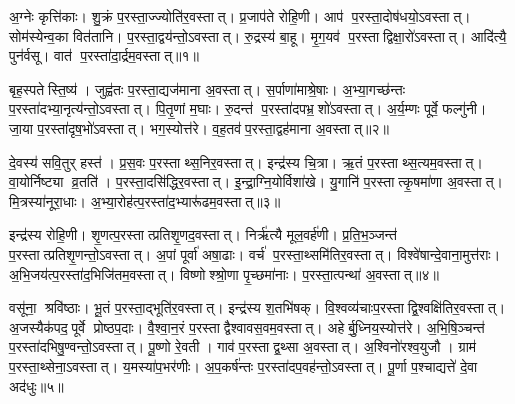 



\clearpage
{}
\setcounter{anuvakam}{0}
अ॒ग्नेः कृत्ति॑काः। शु॒क्रं प॒रस्ता॒ज्ज्योति॑र॒वस्तात्। प्र॒जाप॑ते रोहि॒णी। आप॑ प॒रस्ता॒दोष॑धयो॒ऽवस्तात्। सोम॑स्येन्व॒का वित॑तानि। प॒रस्ता॒द्वय॑न्तो॒ऽवस्तात्। रु॒द्रस्य॑ बा॒हू। मृ॒ग॒यव॑ प॒रस्ताद्विक्षा॒रो॑ऽवस्तात्। आदि॑त्यै॒ पुन॑र्वसू। वात॑ प॒रस्ता॑दा॒र्द्रम॒वस्तात्॥१॥

बृह॒स्पतेस्ति॒ष्य॑। जुह्व॑तः प॒रस्ता॒द्यज॑माना अ॒वस्तात्। स॒र्पाणा॑माश्रे॒षाः। अ॒भ्या॒गच्छ॑न्तः प॒रस्ता॑दभ्या॒नृत्य॑न्तो॒ऽवस्तात्। पि॒तृ॒णां म॒घाः। रु॒दन्त॑ प॒रस्ता॑दपभ्र॒शो॑ऽवस्तात्। अ॒र्य॒म्णः पूर्वे॒ फल्गु॑नी। जा॒या प॒रस्ता॑दृष॒भो॑ऽवस्तात्। भग॒स्योत्त॑रे। व॒ह॒तव॑प॒रस्ता॒द्वह॑माना अ॒वस्तात्॥२॥

दे॒वस्य॑ सवि॒तुर् हस्त॑। प्र॒स॒वः प॒रस्ताथ्स॒निर॒वस्तात्। इन्द्र॑स्य चि॒त्रा। ऋ॒तं प॒रस्ताथ्स॒त्यम॒वस्तात्। वा॒योर्निष्ट्या व्र॒तति॑। प॒रस्ता॒दसि॑द्धिर॒वस्तात्। इ॒न्द्रा॒ग्नि॒योर्विशा॑खे। यु॒गानि॑ प॒रस्तात्कृ॒षमा॑णा अ॒वस्तात्। मि॒त्रस्या॑नूरा॒धाः। अ॒भ्या॒रोह॑त्प॒रस्ता॑द॒भ्यारू॑ढम॒वस्तात्॥३॥

इन्द्र॑स्य रोहि॒णी। शृ॒णत्प॒रस्तात्प्रतिशृ॒णद॒वस्तात्। निर्\mbox{}ऋ॑त्यै मूल॒वर्\mbox{}ह॑णी। प्र॒ति॒भ॒ञ्जन्त॑ प॒रस्तात्प्रतिशृ॒णन्तो॒ऽवस्तात्। अ॒पां पूर्वा॑ अषा॒ढाः। वर्च॑ प॒रस्ता॒थ्समि॑तिर॒वस्तात्। विश्वे॑षान्दे॒वाना॒मुत्त॑राः। अ॒भि॒जय॑त्प॒रस्ता॑द॒भिजि॑तम॒वस्तात्। विष्णोश्श्रो॒णा पृ॒च्छमा॑नाः। प॒रस्ता॒त्पन्था॑ अ॒वस्तात्॥४॥

वसू॑ना॒ श्रवि॑ष्ठाः। भू॒तं प॒रस्ता॒द्भूति॑र॒वस्तात्। इन्द्र॑स्य श॒तभि॑षक्। वि॒श्वव्य॑चाःप॒रस्ताद्वि॒श्वक्षि॑तिर॒वस्तात्। अ॒जस्यैक॑पद॒पूर्वे प्रोष्ठप॒दाः। वै॒श्वा॒न॒रं प॒रस्ताद्वैश्वावस॒वम॒वस्तात्। अहेर्बु॒ध्निय॒स्योत्त॑रे। अ॒भि॒षि॒ञ्चन्त॑ प॒रस्ता॑दभिषु॒ण्वन्तो॒ऽवस्तात्। पू॒ष्णो रे॒वती। गाव॑प॒रस्ताद्व॒थ्सा अ॒वस्तात्। अ॒श्विनो॑रश्व॒युजौ। ग्राम॑ प॒रस्ता॒थ्सेना॒ऽवस्तात्। य॒मस्या॑प॒भर॑णीः। अ॒प॒कर्\mbox{}ष॑न्तः प॒रस्ता॑दप॒वह॑न्तो॒ऽवस्तात्। पू॒र्णा प॒श्चाद्यत्ते॑ दे॒वा अद॑धुः॥५॥\anuvakamend[आ॒र्द्रम॒वस्ता॒द्वह॑माना अ॒वस्ता॑द॒भ्यारू॑ढम॒वस्ता॒त्पन्था॑ अ॒वस्ताद्व॒थ्सा अ॒वस्ता॒त्पञ्च॑ च]

